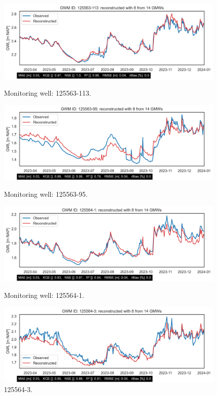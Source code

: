 \begin{figure}[h]
    \begin{minipage}{0.45\linewidth}
        \includegraphics[width=\linewidth]{GWM_reconstructed125563-113.png}
        \caption{Monitoring well: 125563-113.}
        \label{fig:label3}
    \end{minipage}
    \hfill
    \begin{minipage}{0.45\linewidth}
        \includegraphics[width=\linewidth]{GWM_reconstructed125563-95.png}
        \caption{Monitoring well: 125563-95.}
        \label{fig:label4}
    \end{minipage}
    
    \begin{minipage}{0.45\linewidth}
        \includegraphics[width=\linewidth]{GWM_reconstructed125564-1.png}
        \caption{Monitoring well: 125564-1.}
        \label{fig:label5}
    \end{minipage}
    \hfill
    \begin{minipage}{0.45\linewidth}
        \includegraphics[width=\linewidth]{GWM_reconstructed125564-3.png}
        \caption{125564-3.}
        \label{fig:label6}
    \end{minipage}
\end{figure}
